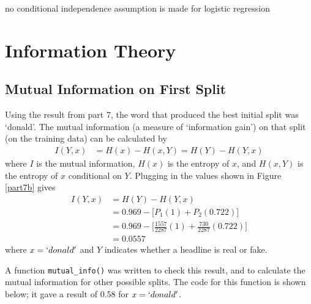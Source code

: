 \documentclass{article}
\begin{document}
   no conditional independence assumption is made for logistic regression


   \section{Information Theory}
   \subsection{Mutual Information on First Split}
   Using the result from part 7, the word that produced the best initial split was `donald'. The mutual information
   (a measure of `information gain') on that split (on the training data) can be calculated by
   \begin{equation*} \begin{split}
      I(Y, x)  &= H(x) - H(x, Y) = H(Y) - H(Y,x)
   \end{split} \end{equation*}
   where $I$ is the mutual information, $H(x)$ is the entropy of $x$, and $H(x, Y)$ is the entropy of $x$ conditional
   on $Y$.
   Plugging in the values shown in Figure \ref{part7b} gives
   \begin{equation*} \begin{split}
      I(Y, x)  &= H(Y) - H(Y,x) \\
               &= 0.969 - \bigg[ P_1 (1) + P_2 (0.722)  \bigg] \\
               &= 0.969 - \bigg[ \frac{1557}{2287} (1) + \frac{730}{2287} (0.722)  \bigg] \\
               &= 0.0557
   \end{split} \end{equation*}
   where $x = `donald'$ and $Y$ indicates whether a headline is real or fake.

   A function \texttt{mutual\_info()} was written to check this result, and to calculate the mutual
   information for other possible splits. The code for this function is shown below; it gave a result
   of 0.58 for $x = `donald'$.
\end{document}
